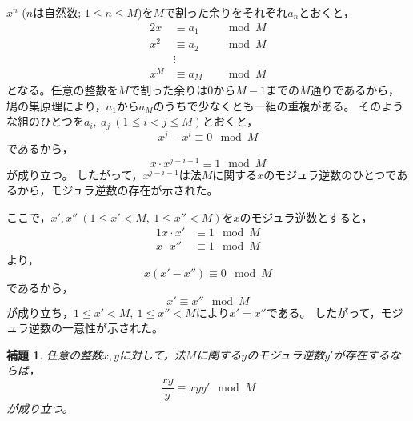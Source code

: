 \documentclass{article}
\makeatletter
\renewenvironment{proof}[1][\proofname]{\par
        \pushQED{\qed}
        \normalfont
        \topsep6\p@\@plus6\p@ \trivlist
        \item[\hskip\labelsep{\bfseries #1}\@addpunct{\bfseries}]\ignorespaces
    }{%
        \popQED\endtrivlist\@endpefalse
    }
\renewcommand{\proofname}{証明.}
\newtheorem{lemma}{補題}
\makeatother
\begin{document}
\begin{proof}
    $x^n$ ($n$は自然数; $1 \leq n \leq M$)を$M$で割った余りをそれぞれ$a_n$とおくと，
    \begin{alignat}{2}
        x   &\equiv a_1   & &\mod{M} \\
        x^2 &\equiv a_2 & &\mod{M} \\
            &\vdots& & \\
        x^M &\equiv a_M & &\mod{M}
    \end{alignat}
    となる。任意の整数を$M$で割った余りは0から$M - 1$までの$M$通りであるから，
    鳩の巣原理により，$a_1$から$a_M$のうちで少なくとも一組の重複がある。
    そのような組のひとつを$a_i,\ a_j\ (1 \leq i < j \leq M)$とおくと，
    \begin{equation}
        x^j - x^i \equiv 0 \mod{M}
    \end{equation}
    であるから，
    \begin{equation}
        x \cdot x^{j - i - 1} \equiv 1 \mod{M}
    \end{equation}
    が成り立つ。
    したがって，$x^{j - i - 1}$は法$M$に関する$x$のモジュラ逆数のひとつであるから，モジュラ逆数の存在が示された。

    ここで，$x', x''\ (1 \leq x' < M,\ 1 \leq x'' < M)$を$x$のモジュラ逆数とすると，
    \begin{alignat}{1}
        x \cdot x'  &\equiv 1 \mod{M} \\
        x \cdot x'' &\equiv 1 \mod{M}
    \end{alignat}
    より，
    \begin{equation}
        x (x' - x'') \equiv 0 \mod{M}
    \end{equation}
    であるから，
    \begin{equation}
        x' \equiv x'' \mod{M}
    \end{equation}
    が成り立ち，$1 \leq x' < M,\ 1 \leq x'' < M$により$x' = x''$である。
    したがって，モジュラ逆数の一意性が示された。
\end{proof}

\begin{screen}
    \begin{lemma}
        \label{lemma:inv:2}
        任意の整数$x, y$に対して，法$M$に関する$y$のモジュラ逆数$y'$が存在するならば，
        \begin{equation}
            \frac{xy}{y} \equiv xyy' \mod{M}
        \end{equation}
        が成り立つ。
    \end{lemma}
\end{screen}
\end{document}
